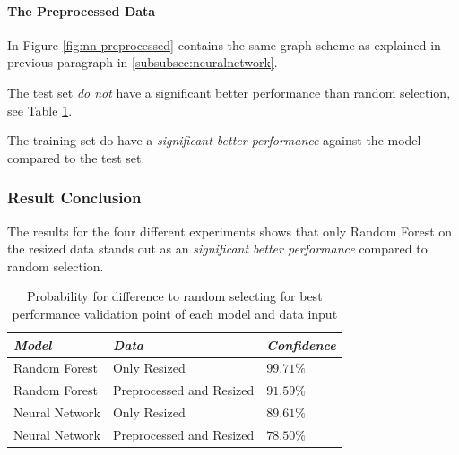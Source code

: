 \paragraph{The Preprocessed Data}
In Figure \ref{fig:nn-preprocessed} contains the same graph scheme as explained in previous paragraph in \ref{subsubsec:neuralnetwork}. 

The test set \emph{do not} have a significant better performance than random selection, see Table \ref{tab:result-conclusion}.

The training set do have a \emph{significant better performance} against the model compared to the test set.

\subsubsection{Result Conclusion}
The results for the four different experiments shows that only Random Forest on the resized data stands out as an \emph{significant better performance} compared to random selection.

\begin{table}
  \caption{Probability for difference to random selecting for best performance validation point of each model and data input}
  \label{tab:result-conclusion}
  \begin{tabularx}{0.9\linewidth}{|X|X|l|} \hline
    \emph{Model}   & \emph{Data}               & \emph{Confidence} \\ \hline
    Random Forest  & Only Resized              & \(99.71 \%\)      \\ \hline
    Random Forest  & Preprocessed and Resized  & \(91.59 \%\)      \\ \hline
    Neural Network & Only Resized              & \(89.61 \%\)      \\ \hline
    Neural Network & Preprocessed and  Resized & \(78.50 \%\)      \\ \hline
  \end{tabularx}
\end{table}

\label{subsec:evaluation}
